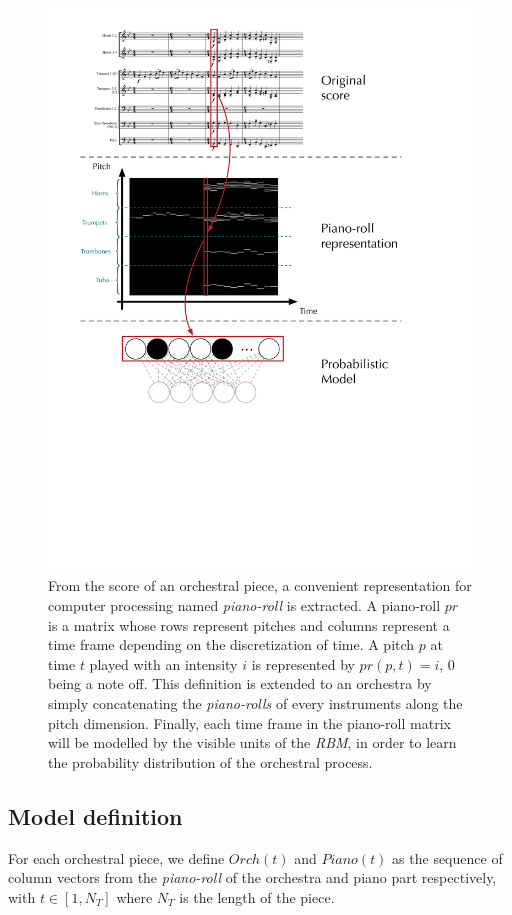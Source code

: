 \documentclass{article}
\begin{document}
\begin{figure}[ht]
\centering
\includegraphics[scale=0.35]{Data_representation/data_representation}
\caption{From the score of an orchestral piece, a convenient representation for computer processing named \textit{piano-roll} is extracted. A piano-roll $pr$ is a matrix whose rows represent pitches and columns represent a time frame depending on the discretization of time. A pitch $p$ at time $t$ played with an intensity $i$ is represented by $pr(p,t) = i$, $0$ being a note off. This definition is extended to an orchestra by simply concatenating the \textit{piano-rolls} of every instruments along the pitch dimension.
Finally, each time frame in the piano-roll matrix will be modelled by the visible units of the \textit{RBM}, in order to learn the probability distribution of the orchestral process.}
\label{fig:piano-roll}
\end{figure}

\subsection{Model definition}
For each orchestral piece, we define $Orch(t)$ and $Piano(t)$ as the sequence of column vectors from the \textit{piano-roll} of the orchestra and piano part respectively, with $t \in \left[ 1,N_{T} \right]$ where $N_{T}$ is the length of the piece.
\end{document}
